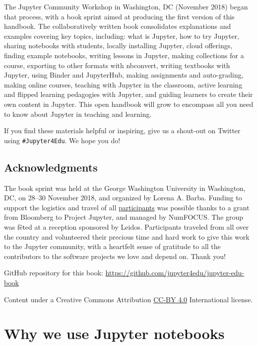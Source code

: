 \documentclass[]{book}
\begin{document}
The Jupyter Community Workshop in Washington, DC (November 2018) began
that process, with a book sprint aimed at producing the first version of
this handbook. The collaboratively written book consolidates
explanations and examples covering key topics, including: what is
Jupyter, how to try Jupyter, sharing notebooks with students, locally
installing Jupyter, cloud offerings, finding example notebooks, writing
lessons in Jupyter, making collections for a course, exporting to other
formats with nbconvert, writing textbooks with Jupyter, using Binder and
JupyterHub, making assignments and auto-grading, making online courses,
teaching with Jupyter in the classroom, active learning and flipped
learning pedagogies with Jupyter, and guiding learners to create their
own content in Jupyter. This open handbook will grow to encompass all
you need to know about Jupyter in teaching and learning.

If you find these materials helpful or inspiring, give us a shout-out on
Twitter using \texttt{\#Jupyter4Edu}. We hope you do!

\section*{Acknowledgments}\label{acknowledgments}

The book sprint was held at the George Washington University in
Washington, DC, on 28--30 November 2018, and organized by Lorena A.
Barba. Funding to support the logistics and travel of all
\protect\hyperlink{authors}{participants} was possible thanks to a grant
from Bloomberg to Project Jupyter, and managed by NumFOCUS. The group
was fêted at a reception sponsored by Leidos. Participants traveled from
all over the country and volunteered their precious time and hard work
to give this work to the Jupyter community, with a heartfelt sense of
gratitude to all the contributors to the software projects we love and
depend on. Thank you!

GitHub repository for this book:
\url{https://github.com/jupyter4edu/jupyter-edu-book}

Content under a Creative Commons Attribution
\href{https://creativecommons.org/licenses/by/4.0/legalcode}{CC-BY 4.0}
International license.

\chapter{Why we use Jupyter
notebooks}\label{why-we-use-jupyter-notebooks}
\end{document}
